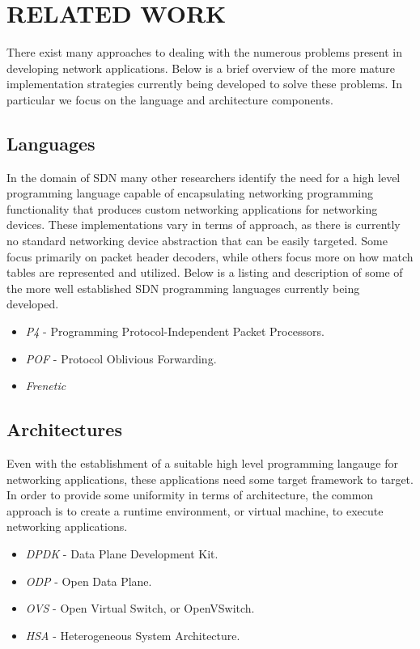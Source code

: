 \chapter{RELATED WORK}
\label{related}

There exist many approaches to dealing with the numerous problems present in
developing network applications. Below is a brief overview of the more mature
implementation strategies currently being developed to solve these problems. In
particular we focus on the language and architecture components.

\section{Languages}
In the domain of SDN many other researchers identify the need for a high level
programming language capable of encapsulating networking programming
functionality that produces custom networking applications for networking
devices. These implementations vary in terms of approach, as there is currently
no standard networking device abstraction that can be easily targeted. Some
focus primarily on packet header decoders, while others focus more on how match
tables are represented and utilized. Below is a listing and description of
some of the more well established SDN programming languages currently being
developed.
\begin{itemize}
\item \emph{P4} - Programming Protocol-Independent Packet Processors.
\item \emph{POF} - Protocol Oblivious Forwarding.
\item \emph{Frenetic}
\end{itemize}

\section{Architectures}
Even with the establishment of a suitable high level programming langauge for
networking applications, these applications need some target framework to
target. In order to provide some uniformity in terms of architecture, the
common approach is to create a runtime environment, or virtual machine, to
execute networking applications.
\begin{itemize}
\item \emph{DPDK} - Data Plane Development Kit.
\item \emph{ODP} - Open Data Plane.
\item \emph{OVS} - Open Virtual Switch, or OpenVSwitch.
\item \emph{HSA} - Heterogeneous System Architecture.
\end{itemize}

